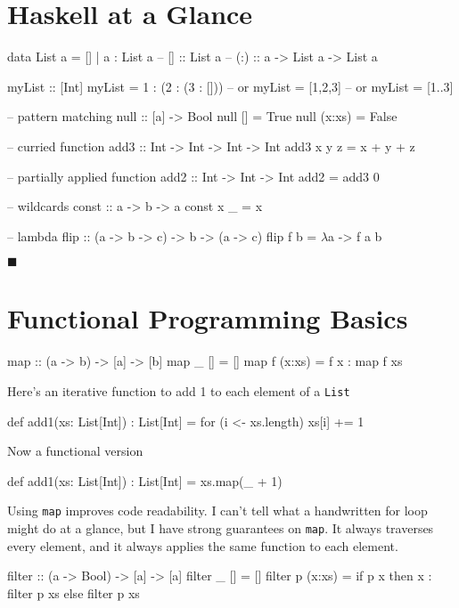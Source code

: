 \documentclass[12pt]{article}
\begin{document}
\section*{Haskell at a Glance}

\begin{haskell}
data List a = [] | a : List a
-- []  :: List a
-- (:) :: a -> List a -> List a

myList :: [Int]
myList = 1 : (2 : (3 : []))
-- or myList = [1,2,3]
-- or myList = [1..3]

-- pattern matching
null :: [a] -> Bool
null []     = True
null (x:xs) = False

-- curried function
add3 :: Int -> Int -> Int -> Int
add3 x y z = x + y + z

-- partially applied function
add2 :: Int -> Int -> Int
add2 = add3 0

-- wildcards
const :: a -> b -> a
const x _ = x

-- lambda
flip :: (a -> b -> c) -> b -> (a -> c)
flip f b = $\lambda$a -> f a b
\end{haskell}
$ \blacksquare $
\newpage
\section*{Functional Programming Basics}

\begin{haskell}
map :: (a -> b) -> [a] -> [b]
map _ []     = []
map f (x:xs) = f x : map f xs
\end{haskell}

Here's an iterative function to add 1 to each element of a \texttt{List}
\begin{scala}
def add1(xs: List[Int]) : List[Int] = {
    for (i <- xs.length) {
        xs[i] += 1
    }
}
\end{scala}

Now a functional version
\begin{scala}
def add1(xs: List[Int]) : List[Int] = {
    xs.map(_ + 1)
}
\end{scala}

Using \texttt{map} improves code readability.  I can't tell what a handwritten
for loop might do at a glance, but I have strong guarantees on \texttt{map}. It
always traverses every element, and it always applies the same function to each
element.
\newpage

\begin{haskell}
filter :: (a -> Bool) -> [a] -> [a]
filter _ []     = []
filter p (x:xs) =
    if p x
       then x : filter p xs
       else     filter p xs
\end{haskell}
\end{document}
